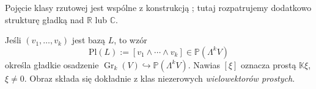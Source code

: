 Pojęcie klasy rzutowej jest wspólne z konstrukcją
;
tutaj rozpatrujemy dodatkowo strukturę gładką nad $\mathbb R$ lub $\mathbb C$.

\begin{twierdzenie}
\label{thm:lin29-grass-plucker}
Jeśli $(v_1,\ldots,v_k)$ jest bazą $L$, to wzór
\begin{equation}\label{eq:lin29-plucker}
 \mathrm{Pl}(L):=[v_1\wedge\cdots\wedge v_k]
 \in\mathbb P(\Lambda^k V)
\end{equation}
określa gładkie osadzenie
$\operatorname{Gr}_k(V)\hookrightarrow\mathbb P(\Lambda^k V)$.
Nawias $[\xi]$ oznacza prostą $\mathbb K\xi$,
$\xi\ne0$. Obraz składa się dokładnie z klas
niezerowych \emph{wielowektorów prostych}.
\end{twierdzenie}
